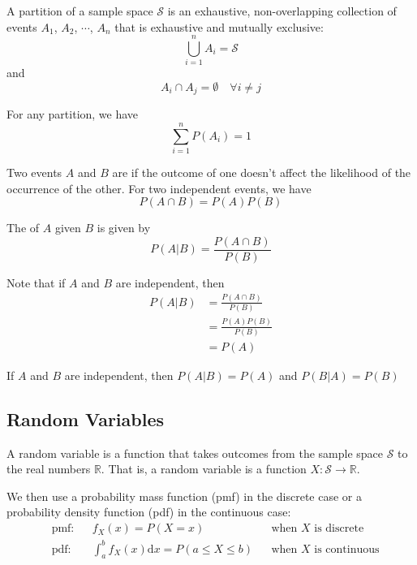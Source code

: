 \documentclass[11pt]{article}
\begin{document}
A partition of a sample space $\mathcal{S}$ is an exhaustive, non-overlapping
collection of events $A_1$, $A_2$, $\cdots$, $A_n$ that is exhaustive and
mutually exclusive: \[\bigcup_{i=1}^{n} A_i = \mathcal{S}\] and \[A_i \cap A_j = \emptyset \quad \forall i \neq j\]

For any partition, we have \[\sum_{i=1}^{n} P(A_i) = 1\]

Two events $A$ and $B$ are  if the outcome of one doesn't
affect the likelihood of the occurrence of the other. For two independent
events, we have \[P(A \cap B) = P(A)P(B)\]

The  of $A$ given $B$ is given by \[P(A|B) = \frac{P(A \cap B)}{P(B)}\]

\begin{lemma}
	Note that if $A$ and $B$ are independent, then \begin{align*}
		P(A|B) & = \frac{P(A \cap B)}{P(B)} \\
		       & = \frac{P(A)P(B)}{P(B)}    \\
		       & = P(A)
	\end{align*}
\end{lemma}

\begin{corollary}
	If $A$ and $B$ are independent, then $P(A|B) = P(A)$ and $P(B|A) = P(B)$
\end{corollary}

\subsection{Random Variables}

\begin{definition}
	A random variable is a function that takes outcomes from the sample space $\mathcal{S}$ to the real numbers $\mathbb{R}$. That is, a random variable is a function $X: \mathcal{S} \to \mathbb{R}$.
\end{definition}

We then use a probability mass function (pmf) in the discrete case or a
probability density function (pdf) in the continuous case:
\begin{align*}
	 & \text{pmf:} &  & f_X(x) = P(X = x)                                   &  & \text{when } X \text{ is discrete}   \\
	 & \text{pdf:} &  & \int_{a}^{b}f_X(x) \mathrm{d}x = P(a \leq X \leq b) &  & \text{when } X \text{ is continuous}
\end{align*}
\end{document}
